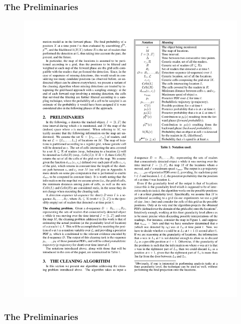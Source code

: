 
\begin{frame}
\frametitle{The Preliminaries}

\begin{figure}[tb]
  \includegraphics[width=0.55\columnwidth]{figures/3-4/3-4-15.pdf}
\end{figure}

\end{frame}


\begin{frame}
\frametitle{The Preliminaries}



\end{frame}
